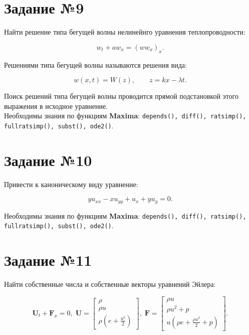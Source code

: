 \section*{Задание №9}

    Найти решение типа бегущей волны нелинейнго уравнения теплопроводности: 

    \[
        w_{t} + a w_{x} =  \left( w w_{x} \right)_{x}.
    \]

    Решениями типа бегущей волны называются решения вида:

    \[
        w(x, t) = W(z), \qquad z = k x - \lambda t.
    \]

    Поиск решений типа бегущей волны проводится прямой подстановкой этого выражения в исходное уравнение.\\

    Необходимы знания по функциям \textbf{Maxima}: {\tt depends(), diff(), ratsimp(), fullratsimp(), subst(), ode2()}.

\section*{Задание №10}

	Привести к каноническому виду уравнение:

	\[
		y u_{xx} - x u_{yy} + u_{x} + y u_{y} = 0.
	\]

	Необходимы знания по функциям \textbf{Maxima}: {\tt depends(), diff(), ratsimp(), fullratsimp(), subst(), ode2()}.

\section*{Задание №11}

	Найти собственные числа и собственные векторы уравнений Эйлера:

	\begin{equation}
		\mathbf{U}_{t} + \mathbf{F}_{x} = 0, \;
		\mathbf{U} =
		\begin{bmatrix}
			\rho \\
			\rho u \\
			\rho \left( e + \frac{u^{2}}{2} \right)
		\end{bmatrix}, \;
		\mathbf{F} =
		\begin{bmatrix}
			\rho u \\
			\rho u^{2} + p \\
			u \left( \rho e + \frac{\rho u^{2}}{2} + p \right)
		\end{bmatrix}.
	\end{equation}

